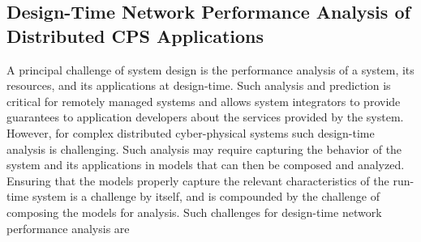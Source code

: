 \subsection{Design-Time Network Performance Analysis of Distributed CPS Applications}
A principal challenge of system design is the performance analysis of
a system, its resources, and its applications at design-time.  Such
analysis and prediction is critical for remotely managed systems and
allows system integrators to provide guarantees to application
developers about the services provided by the system.  However, for
complex distributed cyber-physical systems such design-time analysis
is challenging.  Such analysis may require capturing the behavior of
the system and its applications in models that can then be composed
and analyzed.  Ensuring that the models properly capture the relevant
characteristics of the run-time system is a challenge by itself, and
is compounded by the challenge of composing the models for analysis.
Such challenges for design-time network performance analysis are
